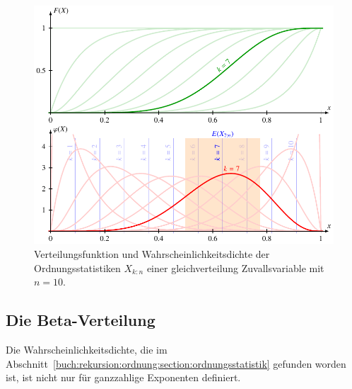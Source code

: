 \begin{figure}
\centering
\includegraphics{chapters/040-rekursion/images/order.pdf}
\caption{Verteilungsfunktion und Wahrscheinlichkeitsdichte der
Ordnungsstatistiken $X_{k:n}$ einer gleichverteilung Zuvallsvariable
mit $n=10$.
\label{buch:rekursion:ordnung:fig:order}}
\end{figure}

%
%
\subsection{Die Beta-Verteilung
\label{buch:rekursion:subsection:beta-verteilung}}
Die Wahrscheinlichkeitsdichte, die im
Abschnitt~\ref{buch:rekursion:ordnung:section:ordnungsstatistik}
gefunden worden ist, ist nicht nur für ganzzahlige Exponenten
definiert.

